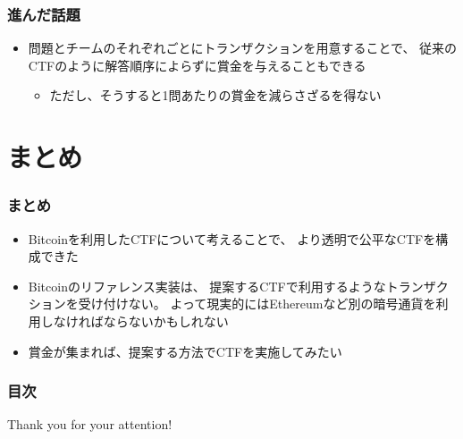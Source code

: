 \begin{frame}
  \frametitle{進んだ話題}

  \begin{itemize}
    \item<+-> 問題とチームのそれぞれごとにトランザクションを用意することで、
    従来のCTFのように解答順序によらずに賞金を与えることもできる
    \begin{itemize}
      \item ただし、そうすると1問あたりの賞金を減らさざるを得ない
    \end{itemize}
  \end{itemize}
\end{frame}

\section{まとめ}

\begin{frame}
  \frametitle{まとめ}

  \pause
  \begin{itemize}
    \item<+-> Bitcoinを利用したCTFについて考えることで、
    より透明で公平なCTFを構成できた

    \item<+-> Bitcoinのリファレンス実装は、
    提案するCTFで利用するようなトランザクションを受け付けない。
    よって現実的にはEthereumなど別の暗号通貨を利用しなければならないかもしれない

    \item<+-> 賞金が集まれば、提案する方法でCTFを実施してみたい
  \end{itemize}
\end{frame}

\begin{frame}
  \frametitle{目次}

  \tableofcontents
\end{frame}

\begin{frame}
  \centering
  {\Huge Thank you for your attention!}
\end{frame}


